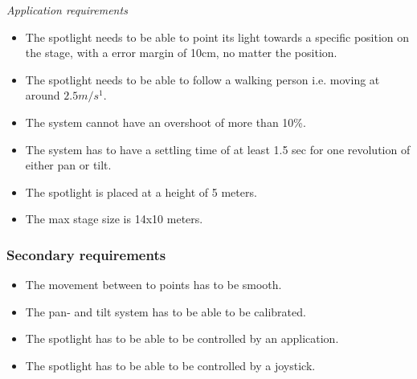 \textit{Application requirements}

\begin{itemize}
\item The spotlight needs to be able to point its light towards a specific position on the stage, with a error margin of 10cm, no matter the position.

\item The spotlight needs to be able to follow a walking person i.e. moving at around $2.5 m/s^{1}$.

\item The system cannot have an overshoot of more than 10\%.

\item The system has to have a settling time of at least 1.5 sec for one revolution of either pan or tilt.

\item The spotlight is placed at a height of 5 meters.

\item The max stage size is 14x10 meters.
\end{itemize}


\subsubsection{Secondary requirements}

\begin{itemize}
\item The movement between to points has to be smooth.

\item The pan- and tilt system has to be able to be calibrated.

\item The spotlight has to be able to be controlled by an application.

\item The spotlight has to be able to be controlled by a joystick.
\end{itemize}
